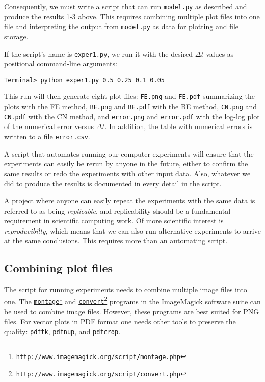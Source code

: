 \documentclass[graybox,sectrefs,envcountresetchap,open=right,final]{svmonodo}
\newenvironment{warning_mdfboxadmon}[1][]{
\begin{warning_mdfboxmdframed}[frametitle=#1]
}
{
\end{warning_mdfboxmdframed}
}
\begin{document}
\noindent
Consequently, we must write a script that can run \texttt{model.py} as described and
produce the results 1-3 above. This requires combining multiple plot files into
one file and interpreting the output from \texttt{model.py} as data for plotting and
file storage.

If the script's name is \texttt{exper1.py}, we run it with the desired $\Delta t$
values as positional command-line arguments:

\begin{Verbatim}[frame=lines,label=\fbox{{\tiny Terminal}},framesep=2.5mm,framerule=0.7pt,fontsize=\fontsize{9pt}{9pt}]
Terminal> python exper1.py 0.5 0.25 0.1 0.05
\end{Verbatim}
This run will then generate eight plot files: \texttt{FE.png} and \texttt{FE.pdf} summarizing
the plots with the FE method, \texttt{BE.png} and \texttt{BE.pdf} with
the BE method, \texttt{CN.png} and \texttt{CN.pdf} with the CN method, and \texttt{error.png}
and \texttt{error.pdf} with the log-log plot of the numerical error versus $\Delta t$.
In addition, the table with numerical errors is written to a
file \texttt{error.csv}.



\begin{warning_mdfboxadmon}
A script that automates running our computer experiments
will ensure
that the experiments can easily be rerun by anyone in
the future, either to confirm the same results or redo the experiments with
other input data.
Also, whatever we did to produce the results is
documented in every detail in the script.

A project where anyone can easily repeat the experiments with the same data
is referred to as being \emph{replicable}, and replicability
should be a fundamental requirement in scientific computing work.
Of more scientific interest is \emph{reproducibilty}, which means that we can
also run alternative experiments to arrive at the same conclusions.
This requires more than an automating script.
\end{warning_mdfboxadmon}



\subsection{Combining plot files}

The script for running experiments needs to combine multiple image
files into one. The
\href{{http://www.imagemagick.org/script/montage.php}}{\nolinkurl{montage}\footnote{\texttt{http://www.imagemagick.org/script/montage.php}}}
and
\href{{http://www.imagemagick.org/script/convert.php}}{\nolinkurl{convert}\footnote{\texttt{http://www.imagemagick.org/script/convert.php}}} programs in
the ImageMagick software suite
can be used to combine image files.
However, these programs are best suited for
PNG files. For vector plots in PDF format one needs other tools
to preserve the quality: \texttt{pdftk}, \texttt{pdfnup}, and \texttt{pdfcrop}.
\end{document}
